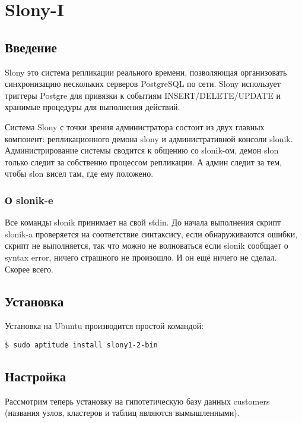 \section{Slony-I}
\label{sec:slonyI}

\subsection{Введение}

Slony это система репликации реального времени, позволяющая организовать синхронизацию нескольких серверов PostgreSQL по сети. Slony использует триггеры Postgre для привязки к событиям INSERT/DELETE/UPDATE и хранимые процедуры для выполнения действий.

Система Slony с точки зрения администратора состоит из двух главных компонент: репликационного демона slony и административной консоли slonik. Администрирование системы сводится к общению со slonik-ом, демон slon только следит за собственно процессом репликации. А админ следит за тем, чтобы slon висел там, где ему положено.

\subsubsection{О slonik-e}

Все команды slonik принимает на свой stdin. До начала выполнения скрипт slonik-a проверяется на соответствие синтаксису, если обнаруживаются ошибки, скрипт не выполняется, так что можно не волноваться если slonik сообщает о syntax error, ничего страшного не произошло. И он ещё ничего не сделал. Скорее всего.

\subsection{Установка}

Установка на Ubuntu производится простой командой:

\begin{lstlisting}[label=lst:slony1,caption=Установка]
$ sudo aptitude install slony1-2-bin
\end{lstlisting}

\subsection{Настройка}
\label{subsec:slonyI-settings}

Рассмотрим теперь установку на гипотетическую базу данных customers (названия узлов, кластеров и таблиц являются вымышленными).

